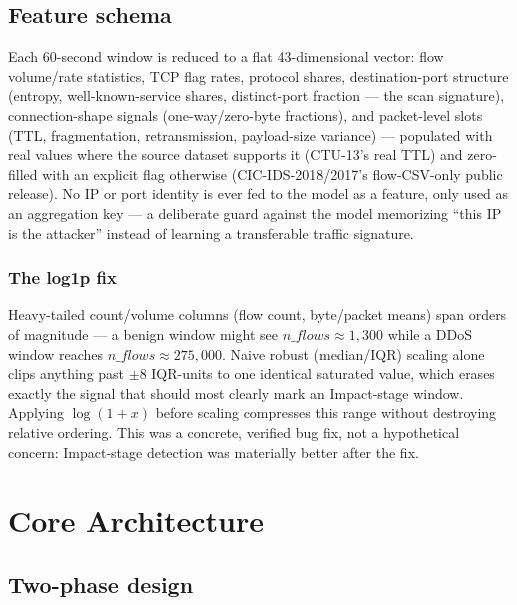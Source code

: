 \documentclass[11pt]{article}
\begin{document}
\subsection{Feature schema}

Each 60-second window is reduced to a flat 43-dimensional vector: flow volume/rate statistics,
TCP flag rates, protocol shares, destination-port structure (entropy, well-known-service shares,
distinct-port fraction --- the scan signature), connection-shape signals (one-way/zero-byte
fractions), and packet-level slots (TTL, fragmentation, retransmission, payload-size variance)
--- populated with real values where the source dataset supports it (CTU-13's real TTL) and
zero-filled with an explicit flag otherwise (CIC-IDS-2018/2017's flow-CSV-only public release).
No IP or port identity is ever fed to the model as a feature, only used as an aggregation key ---
a deliberate guard against the model memorizing ``this IP is the attacker'' instead of learning a
transferable traffic signature.

\subsubsection*{The log1p fix}
Heavy-tailed count/volume columns (flow count, byte/packet means) span orders of magnitude ---
a benign window might see $n\_flows \approx 1{,}300$ while a DDoS window reaches $n\_flows
\approx 275{,}000$. Naive robust (median/IQR) scaling alone clips anything past $\pm 8$
IQR-units to one identical saturated value, which erases exactly the signal that should most
clearly mark an Impact-stage window. Applying $\log(1+x)$ before scaling compresses this range
without destroying relative ordering. This was a concrete, verified bug fix, not a hypothetical
concern: Impact-stage detection was materially better after the fix.

\section{Core Architecture}

\subsection{Two-phase design}
\end{document}
